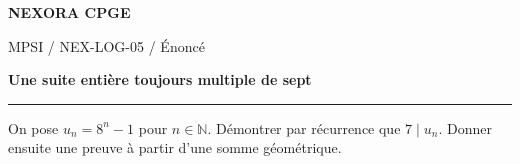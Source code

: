 \documentclass[11pt,a4paper]{article}
\begin{document}
{\small\bfseries\color{nexorablue} NEXORA CPGE}\par
{\small MPSI / NEX-LOG-05 / Énoncé}\par
{\LARGE\bfseries Une suite entière toujours multiple de sept}\par
\vspace{0.25em}\hrule\vspace{0.6em}

On pose $u_n=8^n-1$ pour $n\in\mathbb N$. Démontrer par récurrence que $7\mid u_n$. Donner ensuite une preuve à partir d’une somme géométrique.
\end{document}
